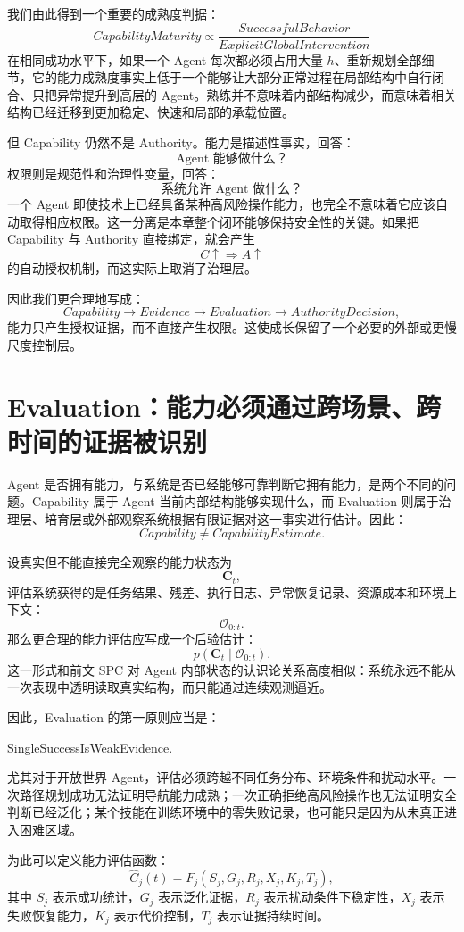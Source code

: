 我们由此得到一个重要的成熟度判据：
\[
\boxed{
CapabilityMaturity
\propto
\frac{
SuccessfulBehavior
}{
ExplicitGlobalIntervention
}
}
\]
在相同成功水平下，如果一个 Agent 每次都必须占用大量 $h$、重新规划全部细节，它的能力成熟度事实上低于一个能够让大部分正常过程在局部结构中自行闭合、只把异常提升到高层的 Agent。熟练并不意味着内部结构减少，而意味着相关结构已经迁移到更加稳定、快速和局部的承载位置。

但 Capability 仍然不是 Authority。能力是描述性事实，回答：
\[
\text{Agent 能够做什么？}
\]
权限则是规范性和治理性变量，回答：
\[
\text{系统允许 Agent 做什么？}
\]
一个 Agent 即使技术上已经具备某种高风险操作能力，也完全不意味着它应该自动取得相应权限。这一分离是本章整个闭环能够保持安全性的关键。如果把 Capability 与 Authority 直接绑定，就会产生
\[
C\uparrow
\Rightarrow
A\uparrow
\]
的自动授权机制，而这实际上取消了治理层。

因此我们更合理地写成：
\[
Capability
\rightarrow
Evidence
\rightarrow
Evaluation
\rightarrow
AuthorityDecision,
\]
能力只产生授权证据，而不直接产生权限。这使成长保留了一个必要的外部或更慢尺度控制层。

\section{Evaluation：能力必须通过跨场景、跨时间的证据被识别}

Agent 是否拥有能力，与系统是否已经能够可靠判断它拥有能力，是两个不同的问题。Capability 属于 Agent 当前内部结构能够实现什么，而 Evaluation 则属于治理层、培育层或外部观察系统根据有限证据对这一事实进行估计。因此：
\[
\boxed{
Capability\neq CapabilityEstimate.
}
\]

设真实但不能直接完全观察的能力状态为
\[
\mathbf C_t,
\]
评估系统获得的是任务结果、残差、执行日志、异常恢复记录、资源成本和环境上下文：
\[
\mathcal O_{0:t}.
\]
那么更合理的能力评估应写成一个后验估计：
\[
p(
\mathbf C_t
\mid
\mathcal O_{0:t}
).
\]
这一形式和前文 SPC 对 Agent 内部状态的认识论关系高度相似：系统永远不能从一次表现中透明读取真实结构，而只能通过连续观测逼近。

因此，Evaluation 的第一原则应当是：
\begin{statementbox}
SingleSuccessIsWeakEvidence.
\end{statementbox}
尤其对于开放世界 Agent，评估必须跨越不同任务分布、环境条件和扰动水平。一次路径规划成功无法证明导航能力成熟；一次正确拒绝高风险操作也无法证明安全判断已经泛化；某个技能在训练环境中的零失败记录，也可能只是因为从未真正进入困难区域。

为此可以定义能力评估函数：
\[
\hat C_j(t)
=
F_j
\left(
S_j,
G_j,
R_j,
X_j,
K_j,
T_j
\right),
\]
其中 $S_j$ 表示成功统计，$G_j$ 表示泛化证据，$R_j$ 表示扰动条件下稳定性，$X_j$ 表示失败恢复能力，$K_j$ 表示代价控制，$T_j$ 表示证据持续时间。

